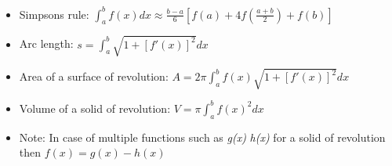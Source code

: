 \begin{itemize}
  \item Simpsons rule: $\int_{a}^{b}f(x)dx \approx \frac{b-a}{6}[f(a)+4f(\frac{a+b}{2})+f(b)]$

  \item Arc length: $s = \int_{a}^{b}\sqrt{1+[f'(x)]^{2}}dx$

  \item Area of a surface of revolution: $A = 2\pi \int_{a}^{b}f(x)\sqrt{1+[f'(x)]^{2}}dx $

  \item Volume of a solid of revolution: $V = \pi \int_{a}^{b}f(x)^{2}dx$

  \item Note: In case of multiple functions such as \textit{g(x)} \textit{h(x)} for a solid of revolution then $f(x)=g(x)-h(x)$
\end{itemize}
